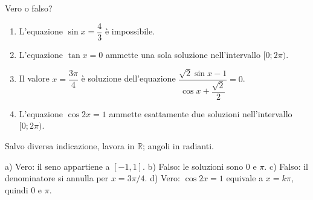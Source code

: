 
\begin{esercizio}
Vero o falso? 

\begin{enumerate}
\item L'equazione $\sin x=\dfrac{4}{3}$ è impossibile. 

\item L'equazione $\tan x=0$ ammette una sola soluzione
nell'intervallo $[0;2\pi)$. 

\item Il valore $x=\dfrac{3\pi}{4}$ è soluzione dell'equazione
$\dfrac{\sqrt{2}\sin x-1}{\cos x+\dfrac{\sqrt{2}}{2}}=0$.


\item L'equazione $\cos 2x=1$ ammette esattamente due soluzioni
nell'intervallo $[0;2\pi)$. 
\end{enumerate}
Salvo diversa indicazione, lavora in $\mathbb R$; angoli in radianti.
\end{esercizio}

\begin{soluzione}
a) Vero: il seno appartiene a $[-1,1]$.
b) Falso: le soluzioni sono $0$ e $\pi$.
c) Falso: il denominatore si annulla per $x=3\pi/4$.
d) Vero: $\cos2x=1$ equivale a $x=k\pi$, quindi $0$ e $\pi$.
\end{soluzione}
